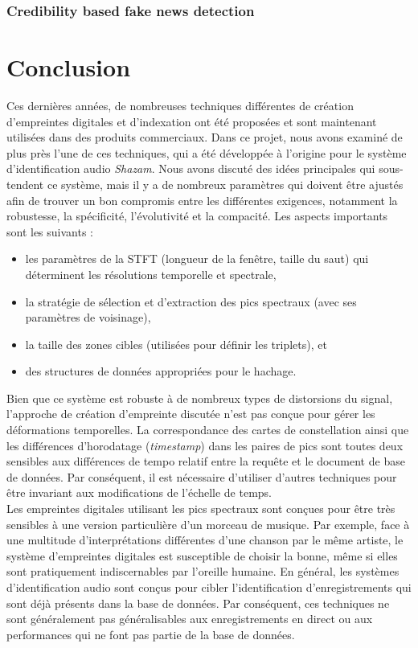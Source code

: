 \documentclass[10pt, english]{report}
\begin{document}
\subsection{Credibility based fake news detection}




\chapter{Conclusion}
Ces dernières années, de nombreuses techniques différentes de création d'empreintes digitales et d'indexation ont été proposées et sont maintenant utilisées dans des produits commerciaux. Dans ce projet, nous avons examiné de plus près l'une de ces techniques, qui a été développée à l'origine pour le système d'identification audio \textit{Shazam}. Nous avons discuté des idées principales qui sous-tendent ce système, mais il y a de nombreux paramètres qui doivent être ajustés afin de trouver un bon compromis entre les différentes exigences, notamment la robustesse, la spécificité, l'évolutivité et la compacité. Les aspects importants sont les suivants :\\

 \begin{itemize}
	\item les paramètres de la STFT (longueur de la fenêtre, taille du saut) qui déterminent les résolutions temporelle et spectrale,
	\item la stratégie de sélection et d'extraction des pics spectraux (avec ses paramètres de voisinage),
	\item la taille des zones cibles (utilisées pour définir les triplets), et
	\item des structures de données appropriées pour le hachage.
\end{itemize}

\vspace{0.5cm}
Bien que ce système est robuste à de nombreux types de distorsions du signal, l'approche de création d'empreinte discutée n'est pas conçue pour gérer les déformations temporelles. La correspondance des cartes de constellation ainsi que les différences d'horodatage (\textit{timestamp}) dans les paires de pics sont toutes deux sensibles aux différences de tempo relatif entre la requête et le document de base de données. Par conséquent, il est nécessaire d'utiliser d'autres techniques pour être invariant aux modifications de l'échelle de temps.\\

Les empreintes digitales utilisant les pics spectraux sont conçues pour être très sensibles à une version particulière d'un morceau de musique. Par exemple, face à une multitude d'interprétations différentes d'une chanson par le même artiste, le système d'empreintes digitales est susceptible de choisir la bonne, même si elles sont pratiquement indiscernables par l'oreille humaine. En général, les systèmes d'identification audio sont conçus pour cibler l'identification d'enregistrements qui sont déjà présents dans la base de données. Par conséquent, ces techniques ne sont généralement pas généralisables aux enregistrements en direct ou aux performances qui ne font pas partie de la base de données.
\end{document}
